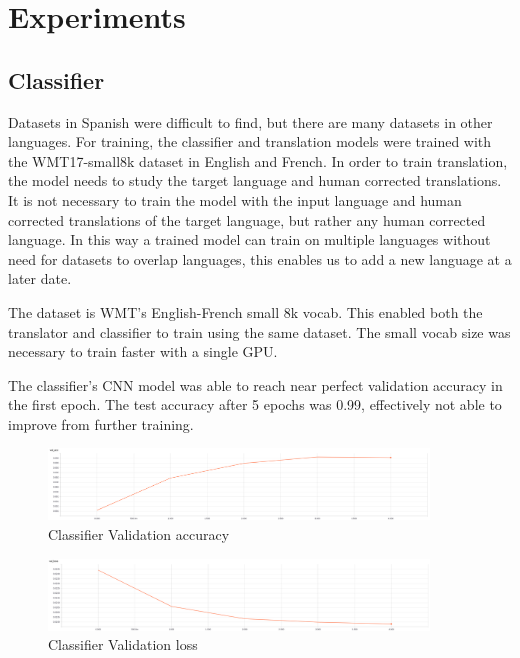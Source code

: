 \documentclass[10pt,a4paper]{article}
\begin{document}
\clearpage


\section{Experiments}

\subsection{Classifier}
Datasets in Spanish were difficult to find, but there are many datasets in other languages. For training, the classifier and translation models were trained with the WMT17-small8k dataset in English and French. In order to train translation, the model needs to study the target language and human corrected translations. It is not necessary to train the model with the input language and human corrected translations of the target language, but rather any human corrected language. In this way a trained model can train on multiple languages without need for datasets to overlap languages, this enables us to add a new language at a later date.


The dataset is WMT's English-French small 8k vocab. This enabled both the translator and classifier to train using the same dataset. The small vocab size was necessary to train faster with a single GPU.


The classifier's CNN model was able to reach near perfect validation accuracy in the first epoch. The test accuracy after 5 epochs was 0.99, effectively not able to improve from further training.

\begin{figure}[H]
  \begin{center}
    \includegraphics[width=0.9\textwidth] {val_acc1.png}
    \caption{Classifier Validation accuracy}
  \end{center}
\end{figure}

\begin{figure}[H]
  \begin{center}
    \includegraphics[width=0.9\textwidth] {val_loss1.png}
    \caption{Classifier Validation loss}
  \end{center}
\end{figure}
\end{document}
